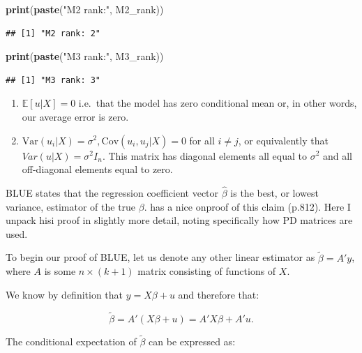 \documentclass[
]{book}
\newenvironment{Shaded}{\begin{snugshade}}{\end{snugshade}}
\newcommand{\KeywordTok}[1]{\textcolor[rgb]{0.13,0.29,0.53}{\textbf{#1}}}
\newcommand{\NormalTok}[1]{#1}
\newcommand{\StringTok}[1]{\textcolor[rgb]{0.31,0.60,0.02}{#1}}
\begin{document}
\begin{Shaded}
\begin{Highlighting}[]
\KeywordTok{print}\NormalTok{(}\KeywordTok{paste}\NormalTok{(}\StringTok{"M2 rank:"}\NormalTok{, M2_rank))}
\end{Highlighting}
\end{Shaded}

\begin{verbatim}
## [1] "M2 rank: 2"
\end{verbatim}

\begin{Shaded}
\begin{Highlighting}[]
\KeywordTok{print}\NormalTok{(}\KeywordTok{paste}\NormalTok{(}\StringTok{"M3 rank:"}\NormalTok{, M3_rank))}
\end{Highlighting}
\end{Shaded}

\begin{verbatim}
## [1] "M3 rank: 3"
\end{verbatim}

\begin{enumerate}
\def\labelenumi{\arabic{enumi}.}
\setcounter{enumi}{2}
\item
  \(\mathbb{E}[u|X] = 0\) i.e.~that the model has zero conditional mean or, in other words, our average error is zero.
\item
  \(\text{Var}(u_i|X) = \sigma^2, \text{Cov}(u_i,u_j|X) = 0\) for all \(i \neq j\), or equivalently that \(Var(u|X) = \sigma^2I_n\). This matrix has diagonal elements all equal to \(\sigma^2\) and all off-diagonal elements equal to zero.
\end{enumerate}

BLUE states that the regression coefficient vector \(\hat{\beta}\) is the best, or lowest variance, estimator of the true \(\beta\). \citet{Wooldridge_intro} has a nice onproof of this claim (p.812). Here I unpack hisi proof in slightly more detail, noting specifically how PD matrices are used.

To begin our proof of BLUE, let us denote any other linear estimator as \(\tilde{\beta} = A'y\), where \(A\) is some \(n \times (k+1)\) matrix consisting of functions of \(X\).

We know by definition that \(y = X\beta + u\) and therefore that:

\[
\tilde{\beta} = A'(X\beta + u) = A'X\beta + A'u.
\]

The conditional expectation of \(\tilde{\beta}\) can be expressed as:
\end{document}
